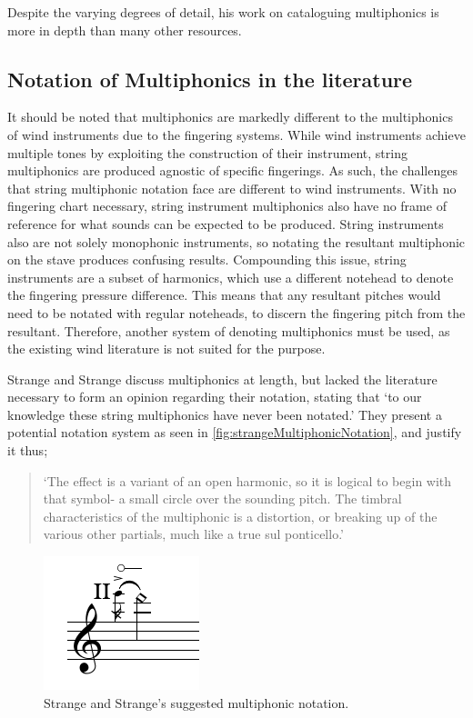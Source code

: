   Despite the varying degrees of detail, his work on cataloguing multiphonics is more in depth than many other resources.


\subsection{Notation of Multiphonics in the literature}

It should be noted that multiphonics are markedly different to the multiphonics of wind instruments due to the fingering systems.
While wind instruments achieve multiple tones by exploiting the construction of their instrument, string multiphonics are produced agnostic of specific fingerings.
As such, the challenges that string multiphonic notation face are different to wind instruments.
With no fingering chart necessary, string instrument multiphonics also have no frame of reference for what sounds can be expected to be produced.
String instruments also are not solely monophonic instruments, so notating the resultant multiphonic on the stave produces confusing results.
Compounding this issue, string instruments are a subset of harmonics, which use a different notehead to denote the fingering pressure difference.
This means that any resultant pitches would need to be notated with regular noteheads, to discern the fingering pitch from the resultant.
Therefore, another system of denoting multiphonics must be used, as the existing wind literature is not suited for the purpose.

Strange and Strange discuss multiphonics at length, but lacked the literature necessary to form an opinion regarding their notation, stating that `to our knowledge these string multiphonics have never been notated.'\autocite[132-134]{strangeContemporaryViolinExtended2001}
They present a potential notation system as seen in \autoref{fig:strangeMultiphonicNotation}, and justify it thus;

\begin{quote}
  `The effect is a variant of an open harmonic, so it is logical to begin with that symbol- a small circle over the sounding pitch. 
  The timbral characteristics of the multiphonic is a distortion, or breaking up of the various other partials, much like a true sul ponticello.'
\end{quote}

  \begin{figure}
    \centering
    \includegraphics{./resources/strangeMultiphonicNotation.pdf}
    \caption{Strange and Strange's suggested multiphonic notation.}
  \label{fig:strangeMultiphonicNotation}
  \end{figure}

